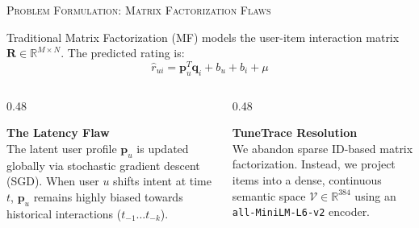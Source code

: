 \documentclass[xcolor=dvipsnames, aspectratio=1610]{beamer}
\begin{document}
\begin{frame}{\textsc{Problem Formulation: Matrix Factorization Flaws}}
  
  Traditional Matrix Factorization (MF) models the user-item interaction matrix $\mathbf{R} \in \mathbb{R}^{M \times N}$. The predicted rating is:
  \begin{equation}
      \hat{r}_{ui} = \mathbf{p}_u^T \mathbf{q}_i + b_u + b_i + \mu
  \end{equation}

  \vspace{2.5mm}
  \begin{columns}[T]
    \begin{column}{0.48\textwidth}
      \begin{CommentBox}
        \textbf{The Latency Flaw} \\
        The latent user profile $\mathbf{p}_u$ is updated globally via stochastic gradient descent (SGD). When user $u$ shifts intent at time $t$, $\mathbf{p}_u$ remains highly biased towards historical interactions ($t_{-1} \dots t_{-k}$).
      \end{CommentBox}
    \end{column}
    \begin{column}{0.48\textwidth}
      \begin{ProposalBox}
        \textbf{TuneTrace Resolution} \\
        We abandon sparse ID-based matrix factorization. Instead, we project items into a dense, continuous semantic space $\mathcal{V} \in \mathbb{R}^{384}$ using an \texttt{all-MiniLM-L6-v2} encoder.
      \end{ProposalBox}
    \end{column}
  \end{columns}
\end{frame}

\end{document}
